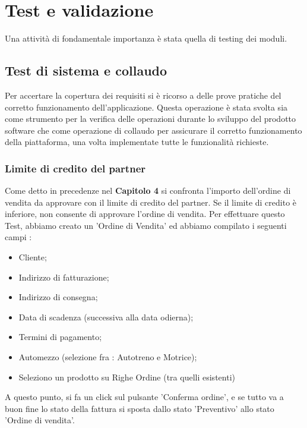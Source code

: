 
\hypertarget{(chap:capitolo5)}{}
\chapter{Test e validazione}
Una attività di fondamentale importanza è stata quella di testing dei moduli.


\section{Test di sistema e collaudo}

Per accertare la copertura dei requisiti si è ricorso a delle prove pratiche del corretto funzionamento dell’applicazione. Questa operazione è stata svolta sia come strumento per la verifica delle operazioni durante lo sviluppo del prodotto software che come operazione di collaudo per assicurare il corretto funzionamento della piattaforma, una volta implementate tutte le funzionalità richieste.

\subsection{Limite di credito del partner}

Come detto in precedenze nel \hypertarget{(chap:capitolo4)}{\textbf{Capitolo 4}} si confronta l'importo dell'ordine di vendita da approvare con il limite di credito del partner. Se il limite di credito è inferiore, non consente di approvare l'ordine di vendita.
\newpage
Per effettuare questo Test, abbiamo creato un 'Ordine di Vendita' ed abbiamo compilato i seguenti campi :
\begin{itemize}
\item Cliente;
\item Indirizzo di fatturazione;
\item Indirizzo di consegna;
\item Data di scadenza (successiva alla data odierna);
\item Termini di pagamento;
\item Automezzo (selezione fra : Autotreno e Motrice);
\item Seleziono un prodotto su Righe Ordine (tra quelli esistenti)
\end{itemize}

A questo punto, si fa un click sul pulsante 'Conferma ordine', e se tutto va a buon fine lo stato della fattura si sposta dallo stato 'Preventivo' allo stato 'Ordine di vendita'.


